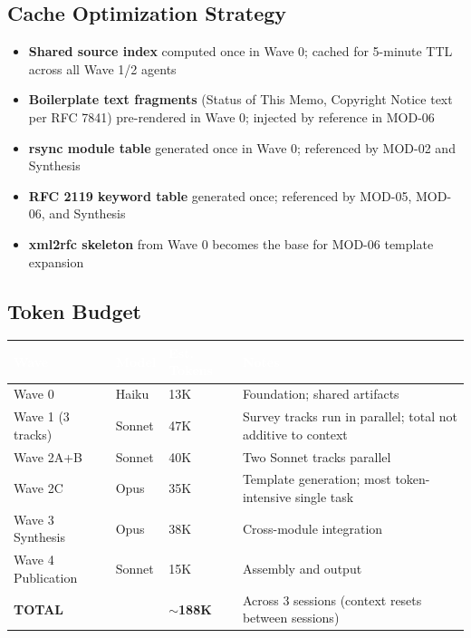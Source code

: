 \documentclass[11pt,letterpaper]{article}
\newcommand{\tableheader}[1]{\textbf{\sffamily\textcolor{white}{#1}}}
\begin{document}
\subsection{Cache Optimization Strategy}

\begin{itemize}[noitemsep]
  \item \textbf{Shared source index} computed once in Wave 0; cached for 5-minute TTL across all Wave 1/2 agents
  \item \textbf{Boilerplate text fragments} (Status of This Memo, Copyright Notice text per RFC 7841) pre-rendered in Wave 0; injected by reference in MOD-06
  \item \textbf{rsync module table} generated once in Wave 0; referenced by MOD-02 and Synthesis
  \item \textbf{RFC 2119 keyword table} generated once; referenced by MOD-05, MOD-06, and Synthesis
  \item \textbf{xml2rfc skeleton} from Wave 0 becomes the base for MOD-06 template expansion
\end{itemize}

\subsection{Token Budget}

\begin{center}
\begin{tabularx}{\textwidth}{L{3cm}C{2cm}C{2cm}X}
\toprule
{}
\tableheader{Wave} & \tableheader{Model} & \tableheader{Est. Tokens} & \tableheader{Notes} \\
\midrule
Wave 0 & Haiku & 13K & Foundation; shared artifacts \\
Wave 1 (3 tracks) & Sonnet & 47K & Survey tracks run in parallel; total not additive to context \\
Wave 2A+B & Sonnet & 40K & Two Sonnet tracks parallel \\
Wave 2C & Opus & 35K & Template generation; most token-intensive single task \\
Wave 3 Synthesis & Opus & 38K & Cross-module integration \\
Wave 4 Publication & Sonnet & 15K & Assembly and output \\
\textbf{TOTAL} & & \textbf{$\sim$188K} & Across 3 sessions (context resets between sessions) \\
\bottomrule
\end{tabularx}
\end{center}
\end{document}
